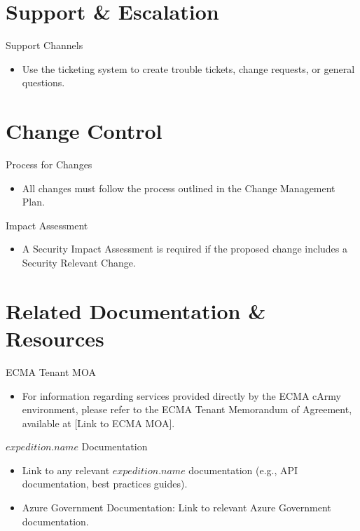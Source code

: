 \documentclass[11pt]{article}
\begin{document}
  \newpage
  \section*{Support \& Escalation}    
    Support Channels
    \begin{itemize}
      \item Use the ticketing system to create trouble tickets, change requests, or general questions. 
    \end{itemize}

  \newpage
  \section*{Change Control}    
    Process for Changes
    \begin{itemize}
      \item All changes must follow the process outlined in the Change Management Plan. 
    \end{itemize}
    Impact Assessment
    \begin{itemize}
      \item A Security Impact Assessment is required if the proposed change includes a Security Relevant Change. 
    \end{itemize}

  \newpage
  \section*{Related Documentation \& Resources}    
    ECMA Tenant MOA
    \begin{itemize}
      \item For information regarding services provided directly by the ECMA cArmy environment, please refer to the ECMA Tenant Memorandum of Agreement, available at [Link to ECMA MOA].  
    \end{itemize}
    $expedition.name$ Documentation
    \begin{itemize}
      \item Link to any relevant $expedition.name$ documentation (e.g., API documentation, best practices guides).
      \item Azure Government Documentation: Link to relevant Azure Government documentation.
    \end{itemize}

  \newpage
\end{document}
